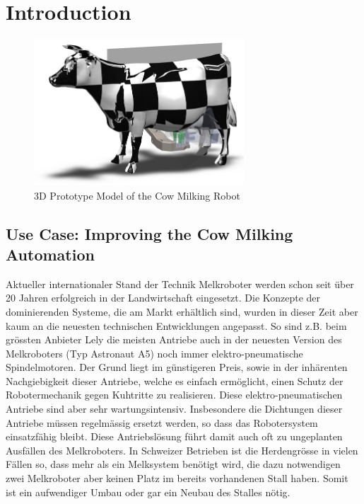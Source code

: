 \chapter{Introduction}\label{chap:introduction}
   \begin{figure}[!ht]
        \centering
        \includegraphics[width=0.7\textwidth]{images/cow_system.png}
        \caption{3D Prototype Model of the Cow Milking Robot}
        \label{fig:cow_fmc}
    \end{figure}
    
\section{Use Case: Improving the Cow Milking Automation}

Aktueller internationaler Stand der Technik
Melkroboter werden schon seit über 20 Jahren erfolgreich in der Landwirtschaft eingesetzt. Die Konzepte der dominierenden Systeme, die am Markt erhältlich sind, wurden in dieser Zeit aber kaum an die neuesten technischen Entwicklungen angepasst. So sind z.B. beim grössten Anbieter Lely die meisten Antriebe auch in der neuesten Version des Melkroboters (Typ Astronaut A5) noch immer elektro-pneumatische Spindelmotoren. Der Grund liegt im günstigeren Preis, sowie in der inhärenten Nachgiebigkeit dieser Antriebe, welche es einfach ermöglicht, einen Schutz der Robotermechanik gegen Kuhtritte zu realisieren. Diese elektro-pneumatischen Antriebe sind aber sehr wartungsintensiv. Insbesondere die Dichtungen dieser Antriebe müssen regelmässig ersetzt werden, so dass das Robotersystem einsatzfähig bleibt. Diese Antriebslösung führt damit auch oft zu ungeplanten Ausfällen des Melkroboters.
In Schweizer Betrieben ist die Herdengrösse in vielen Fällen so, dass mehr als ein Melksystem benötigt wird, die dazu notwendigen zwei Melkroboter aber keinen Platz im bereits vorhandenen Stall haben. Somit ist ein aufwendiger Umbau oder gar ein Neubau des Stalles nötig.

